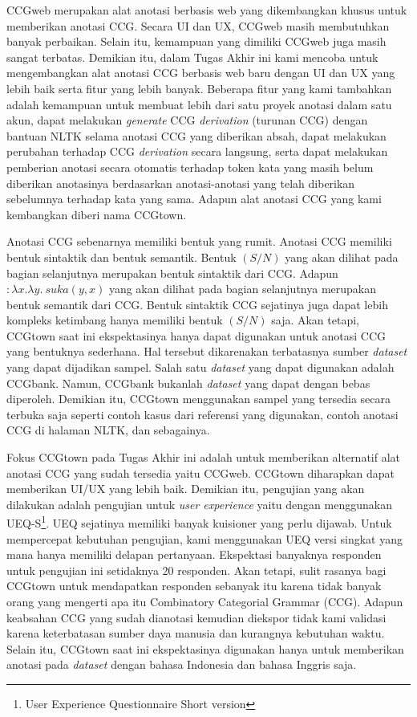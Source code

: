 CCGweb merupakan alat anotasi berbasis web yang dikembangkan khusus untuk memberikan anotasi CCG.
Secara UI dan UX, CCGweb masih membutuhkan banyak perbaikan. Selain itu, kemampuan yang dimiliki
CCGweb juga masih sangat terbatas. Demikian itu, dalam Tugas Akhir ini kami mencoba untuk
mengembangkan alat anotasi CCG berbasis web baru dengan UI dan UX yang lebih baik serta
fitur yang lebih banyak. Beberapa fitur yang kami tambahkan adalah kemampuan untuk membuat lebih
dari satu proyek anotasi dalam satu akun, dapat melakukan \textit{generate} CCG \textit{derivation}
(turunan CCG) dengan bantuan NLTK selama anotasi CCG yang diberikan absah, dapat melakukan
perubahan terhadap CCG \textit{derivation} secara langsung, serta dapat melakukan pemberian anotasi
secara otomatis terhadap token kata yang masih belum diberikan anotasinya berdasarkan anotasi-anotasi
yang telah diberikan sebelumnya terhadap kata yang sama. Adapun alat anotasi CCG yang kami kembangkan
diberi nama CCGtown.

Anotasi CCG sebenarnya memiliki bentuk yang rumit. Anotasi CCG memiliki bentuk sintaktik dan
bentuk semantik. Bentuk $(S/N)$ yang akan dilihat pada bagian selanjutnya merupakan bentuk sintaktik
dari CCG. Adapun $: \lambda x.\lambda y.\ suka(y, x)$ yang akan dilihat pada bagian selanjutnya
merupakan bentuk semantik dari CCG. Bentuk sintaktik CCG sejatinya juga dapat lebih kompleks
ketimbang hanya memiliki bentuk $(S/N)$ saja. Akan tetapi, CCGtown saat ini ekspektasinya hanya
dapat digunakan untuk anotasi CCG yang bentuknya sederhana. Hal tersebut dikarenakan terbatasnya
sumber \textit{dataset} yang dapat dijadikan sampel. Salah satu \textit{dataset} yang dapat digunakan
adalah CCGbank. Namun, CCGbank bukanlah \textit{dataset} yang dapat dengan bebas diperoleh.
Demikian itu, CCGtown menggunakan sampel yang tersedia secara terbuka saja seperti contoh kasus
dari referensi yang digunakan, contoh anotasi CCG di halaman NLTK, dan sebagainya.

Fokus CCGtown pada Tugas Akhir ini adalah untuk memberikan alternatif alat anotasi CCG yang sudah
tersedia yaitu CCGweb. CCGtown diharapkan dapat memberikan UI/UX yang lebih baik. Demikian itu,
pengujian yang akan dilakukan adalah pengujian untuk \textit{user experience} yaitu dengan
menggunakan UEQ-S\footnote{User Experience Questionnaire Short version}. UEQ sejatinya memiliki
banyak kuisioner yang perlu dijawab. Untuk mempercepat kebutuhan pengujian, kami menggunakan
UEQ versi singkat yang mana hanya memiliki delapan pertanyaan. Ekspektasi banyaknya responden
untuk pengujian ini setidaknya 20 responden. Akan tetapi, sulit rasanya bagi CCGtown untuk
mendapatkan responden sebanyak itu karena tidak banyak orang yang mengerti apa itu Combinatory
Categorial Grammar (CCG). Adapun keabsahan CCG yang sudah dianotasi kemudian diekspor tidak
kami validasi karena keterbatasan sumber daya manusia dan kurangnya kebutuhan waktu.
Selain itu, CCGtown saat ini ekspektasinya digunakan hanya untuk memberikan anotasi pada
\textit{dataset} dengan bahasa Indonesia dan bahasa Inggris saja.
\\


